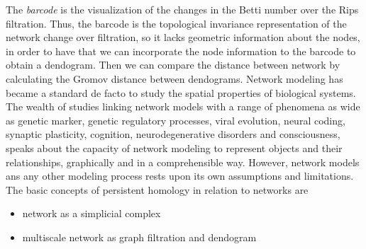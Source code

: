 \documentclass[onecollarge,runningheads]{svjour2}
\begin{document}
The \textit{barcode} is the visualization of the changes in the Betti number over the Rips filtration. Thus, the barcode is the topological invariance representation of the network change over filtration, so it lacks geometric information about the nodes, in order to have that we can incorporate the node information to the barcode to obtain a dendogram. Then we can compare the distance between network by calculating the Gromov distance between dendograms.
Network modeling has became a standard de facto to study the spatial properties of biological systems. The wealth of studies linking network models with a range of phenomena as wide as genetic marker, genetic regulatory processes, viral evolution, neural coding, synaptic plasticity, cognition, neurodegenerative disorders and consciousness, speaks about the capacity of network modeling to represent objects and their relationships, graphically and in a comprehensible way. However, network models ans any other modeling process rests upon its own assumptions and limitations. 
The basic concepts of persistent homology in relation to networks are
\begin{itemize}
\item network as a simplicial complex
\item multiscale network as graph filtration and dendogram 
\end{itemize}
\end{document}
